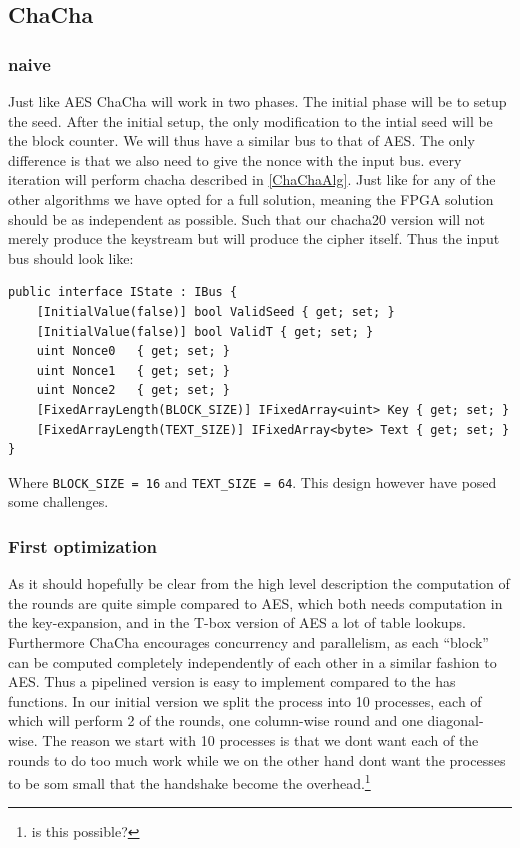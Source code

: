 \documentclass[a4paper]{article}
\begin{document}
\subsection{ChaCha}
\label{sec:orgae4d249}

\subsubsection{naive}
\label{ChaChaNaive}
Just like AES ChaCha will work in two phases. The initial phase will be to setup the seed. After the initial setup, the only modification to the intial seed will be the block counter. We will thus have a similar bus to that of AES. The only difference is that we also need to give the nonce with the input bus. every iteration will perform chacha described in \ref{ChaChaAlg}. Just like for any of the other algorithms we have opted for a full solution, meaning the FPGA solution should be as independent as possible. Such that our chacha20 version will not merely produce the keystream but will produce the cipher itself. Thus the input bus should look like:
\begin{verbatim}
public interface IState : IBus {
    [InitialValue(false)] bool ValidSeed { get; set; }
    [InitialValue(false)] bool ValidT { get; set; }
    uint Nonce0   { get; set; }
    uint Nonce1   { get; set; }
    uint Nonce2   { get; set; }
    [FixedArrayLength(BLOCK_SIZE)] IFixedArray<uint> Key { get; set; }
    [FixedArrayLength(TEXT_SIZE)] IFixedArray<byte> Text { get; set; }
}
\end{verbatim}
Where \texttt{BLOCK\_SIZE = 16} and \texttt{TEXT\_SIZE = 64}. This design however have posed some challenges.
\subsubsection{First optimization}
\label{ChaCha1}
As it should hopefully be clear from the high level description the computation of the rounds are quite simple compared to AES, which both needs computation in the key-expansion, and in the T-box version of AES a lot of table lookups. Furthermore ChaCha encourages concurrency and parallelism, as each ``block'' can be computed completely independently of each other in a similar fashion to AES. Thus a pipelined version is easy to implement compared to the has functions. In our initial version we split the process into 10 processes, each of which will perform 2 of the rounds, one column-wise round and one diagonal-wise. The reason we start with 10 processes is that we dont want each of the rounds to do too much work while we on the other hand dont want the processes to be som small that the handshake become the overhead.\footnote{is this possible?}
\end{document}
